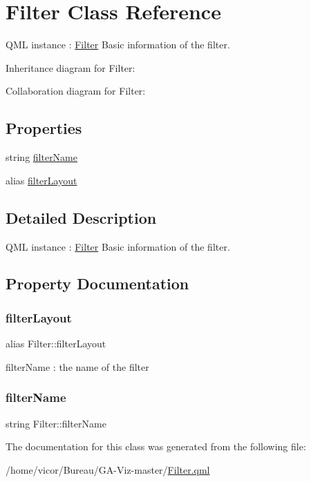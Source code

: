 \hypertarget{class_filter}{}\section{Filter Class Reference}
\label{class_filter}


Q\+ML instance \+: \hyperlink{class_filter}{Filter} Basic information of the filter.  




Inheritance diagram for Filter\+:


Collaboration diagram for Filter\+:
\subsection*{Properties}
\begin{DoxyCompactItemize}
\item 
string \hyperlink{class_filter_a56d19915fd87312c6283e73b19822782}{filter\+Name}
\item 
alias \hyperlink{class_filter_a839ce5abc0ad5732da32a1f9276bc50c}{filter\+Layout}
\end{DoxyCompactItemize}


\subsection{Detailed Description}
Q\+ML instance \+: \hyperlink{class_filter}{Filter} Basic information of the filter. 

\subsection{Property Documentation}
\mbox{\label{class_filter_a839ce5abc0ad5732da32a1f9276bc50c}} 
\subsubsection{\texorpdfstring{filter\+Layout}{filterLayout}}
{\footnotesize\ttfamily alias Filter\+::filter\+Layout}

filter\+Name \+: the name of the filter \mbox{\label{class_filter_a56d19915fd87312c6283e73b19822782}} 
\subsubsection{\texorpdfstring{filter\+Name}{filterName}}
{\footnotesize\ttfamily string Filter\+::filter\+Name}



The documentation for this class was generated from the following file\+:\begin{DoxyCompactItemize}
\item 
/home/vicor/\+Bureau/\+G\+A-\/\+Viz-\/master/\hyperlink{_filter_8qml}{Filter.\+qml}\end{DoxyCompactItemize}
